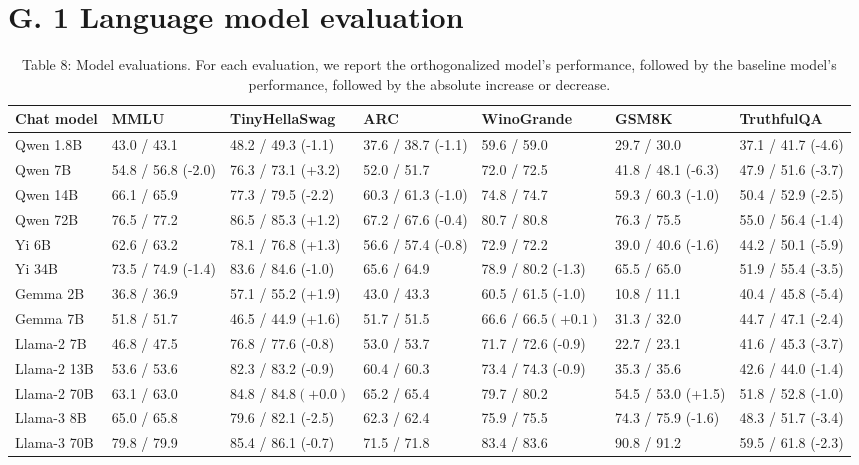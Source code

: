 \documentclass[10pt]{article}
\begin{document}
\section*{G. 1 Language model evaluation}
\begin{table}[h]
\begin{center}
\captionsetup{labelformat=empty}
\caption{Table 8: Model evaluations. For each evaluation, we report the orthogonalized model's performance, followed by the baseline model's performance, followed by the absolute increase or decrease.}
\begin{tabular}{|l|l|l|l|l|l|l|}
\hline
Chat model & MMLU & TinyHellaSwag & ARC & WinoGrande & GSM8K & TruthfulQA \\
\hline
Qwen 1.8B & 43.0 / 43.1 & 48.2 / 49.3 (-1.1) & 37.6 / 38.7 (-1.1) & 59.6 / 59.0 & 29.7 / 30.0 & 37.1 / 41.7 (-4.6) \\
\hline
Qwen 7B & 54.8 / 56.8 (-2.0) & 76.3 / 73.1 (+3.2) & 52.0 / 51.7 & 72.0 / 72.5 & 41.8 / 48.1 (-6.3) & 47.9 / 51.6 (-3.7) \\
\hline
Qwen 14B & 66.1 / 65.9 & 77.3 / 79.5 (-2.2) & 60.3 / 61.3 (-1.0) & 74.8 / 74.7 & 59.3 / 60.3 (-1.0) & 50.4 / 52.9 (-2.5) \\
\hline
Qwen 72B & 76.5 / 77.2 & 86.5 / 85.3 (+1.2) & 67.2 / 67.6 (-0.4) & 80.7 / 80.8 & 76.3 / 75.5 & 55.0 / 56.4 (-1.4) \\
\hline
Yi 6B & 62.6 / 63.2 & 78.1 / 76.8 (+1.3) & 56.6 / 57.4 (-0.8) & 72.9 / 72.2 & 39.0 / 40.6 (-1.6) & 44.2 / 50.1 (-5.9) \\
\hline
Yi 34B & 73.5 / 74.9 (-1.4) & 83.6 / 84.6 (-1.0) & 65.6 / 64.9 & 78.9 / 80.2 (-1.3) & 65.5 / 65.0 & 51.9 / 55.4 (-3.5) \\
\hline
Gemma 2B & 36.8 / 36.9 & 57.1 / 55.2 (+1.9) & 43.0 / 43.3 & 60.5 / 61.5 (-1.0) & 10.8 / 11.1 & 40.4 / 45.8 (-5.4) \\
\hline
Gemma 7B & 51.8 / 51.7 & 46.5 / 44.9 (+1.6) & 51.7 / 51.5 & 66.6 / $66.5(+0.1)$ & 31.3 / 32.0 & 44.7 / 47.1 (-2.4) \\
\hline
Llama-2 7B & 46.8 / 47.5 & 76.8 / 77.6 (-0.8) & 53.0 / 53.7 & 71.7 / 72.6 (-0.9) & 22.7 / 23.1 & 41.6 / 45.3 (-3.7) \\
\hline
Llama-2 13B & 53.6 / 53.6 & 82.3 / 83.2 (-0.9) & 60.4 / 60.3 & 73.4 / 74.3 (-0.9) & 35.3 / 35.6 & 42.6 / 44.0 (-1.4) \\
\hline
Llama-2 70B & 63.1 / 63.0 & 84.8 / $84.8(+0.0)$ & 65.2 / 65.4 & 79.7 / 80.2 & 54.5 / 53.0 (+1.5) & 51.8 / 52.8 (-1.0) \\
\hline
Llama-3 8B & 65.0 / 65.8 & 79.6 / 82.1 (-2.5) & 62.3 / 62.4 & 75.9 / 75.5 & 74.3 / 75.9 (-1.6) & 48.3 / 51.7 (-3.4) \\
\hline
Llama-3 70B & 79.8 / 79.9 & 85.4 / 86.1 (-0.7) & 71.5 / 71.8 & 83.4 / 83.6 & 90.8 / 91.2 & 59.5 / 61.8 (-2.3) \\
\hline
\end{tabular}
\end{center}
\end{table}
\end{document}
